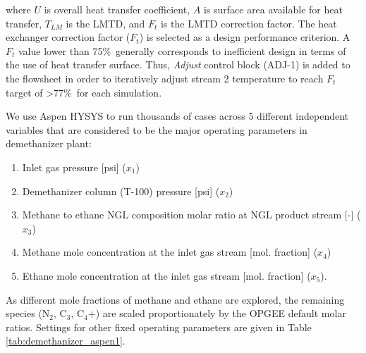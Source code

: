 \documentclass[11pt]{report}
\begin{document}
where $U$ is overall heat transfer coefficient, $A$ is surface area available for heat transfer, \Delta$T_{LM}$ is the LMTD, and $F_{t}$ is the LMTD correction factor. The heat exchanger correction factor ($F_{t}$) is selected as a design performance criterion. A $F_{t}$ value lower than 75\%\ generally corresponds to inefficient design in terms of the use of heat transfer surface. Thus, \emph{Adjust} control block (ADJ-1) is added to the flowsheet in order to iteratively adjust stream 2 temperature to reach $F_{t}$ target of >77\%\ for each simulation.       

We use Aspen HYSYS to run thousands of cases across 5 different independent variables that are considered to be the major operating parameters in demethanizer plant:
\begin{enumerate}
\item Inlet gas pressure [psi] ($x_1$)
\item Demethanizer column (T-100) pressure [psi] ($x_2$)
\item Methane to ethane NGL composition molar ratio at NGL product stream [-] ($x_3$)
\item Methane mole concentration at the inlet gas stream [mol. fraction] ($x_4$)
\item Ethane mole concentration at the inlet gas stream [mol. fraction] ($x_5$).
\end{enumerate}

As different mole fractions of methane and ethane are explored, the remaining species (N$_2$, C$_3$, C$_4$+) are scaled proportionately by the OPGEE default molar ratios. Settings for other fixed operating parameters are given in Table \ref{tab:demethanizer_aspen1}. 
\end{document}
